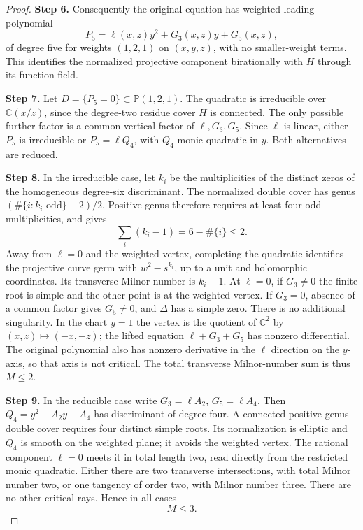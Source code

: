 \begin{proof}
\noindent\textbf{Step 6.} Consequently the original equation has weighted
leading polynomial
\[
          P_5=\ell(x,z)y^2+G_3(x,z)y+G_5(x,z),               \tag{4.53b}
\]
of degree five for weights $(1,2,1)$ on $(x,y,z)$,
with no smaller-weight terms. This identifies the
normalized projective component birationally with
$H$ through its function field.

\noindent\textbf{Step 7.} Let $D=\{P_5=0\}\subset\mathbb P(1,2,1)$.
The quadratic is irreducible over $\mathbb C(x/z)$,
since the degree-two residue cover $H$ is connected.
The only possible further factor is a common
vertical factor of $\ell,G_3,G_5$. Since $\ell$
is linear, either $P_5$ is irreducible or
$P_5=\ell Q_4$, with $Q_4$ monic quadratic in $y$.
Both alternatives are reduced.

\noindent\textbf{Step 8.} In the irreducible case, let $k_i$ be the
multiplicities of the distinct zeros of the
homogeneous degree-six discriminant. The normalized
double cover has genus
$(\#\{i:k_i\text{ odd}\}-2)/2$. Positive genus
therefore requires at least four odd multiplicities,
and gives
\[
              \sum_i(k_i-1)=6-\#\{i\}\le2.                  \tag{4.53c}
\]
Away from $\ell=0$ and the weighted vertex,
completing the quadratic identifies the projective
curve germ with $w^2-s^{k_i}$, up to a unit and
holomorphic coordinates. Its transverse Milnor
number is $k_i-1$. At $\ell=0$, if $G_3\ne0$ the
finite root is simple and the other point is at
the weighted vertex. If $G_3=0$, absence of a
common factor gives $G_5\ne0$, and $\Delta$ has
a simple zero. There is no additional singularity.
In the chart $y=1$ the vertex is the quotient of
$\mathbb C^2$ by $(x,z)\mapsto(-x,-z)$; the
lifted equation $\ell+G_3+G_5$ has nonzero
differential. The original polynomial also has
nonzero derivative in the $\ell$ direction on
the $y$-axis, so that axis is not critical.
The total transverse Milnor-number sum is thus
$M\le2$.

\noindent\textbf{Step 9.} In the reducible case write
$G_3=\ell A_2$, $G_5=\ell A_4$. Then
$Q_4=y^2+A_2y+A_4$ has discriminant of degree four.
A connected positive-genus double cover requires
four distinct simple roots. Its normalization is
elliptic and $Q_4$ is smooth on the weighted plane;
it avoids the weighted vertex. The rational
component $\ell=0$ meets it in total length two,
read directly from the restricted monic quadratic.
Either there are two transverse intersections,
with total Milnor number two, or one tangency of
order two, with Milnor number three. There are no
other critical rays. Hence in all cases
\[
                              M\le3.                       \tag{4.53d}
\]


\end{proof}
